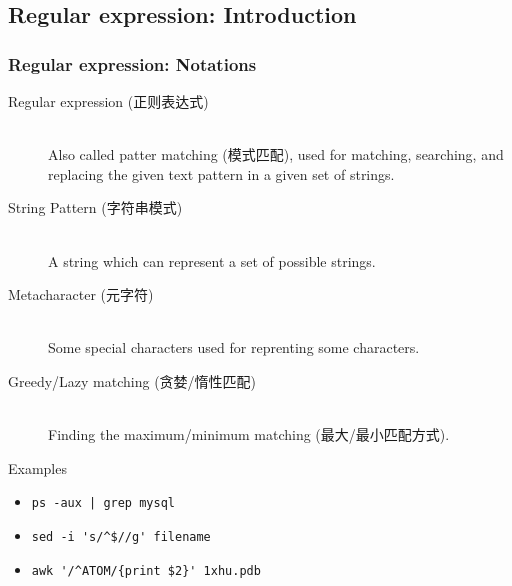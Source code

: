 \documentclass[red]{beamer}
\begin{document}
\begin{CJK*}{UTF8}{gbsn}
\section{Regular expression: Introduction}

\begin{frame}[containsverbatim]
\frametitle{Regular expression: Notations}
\footnotesize
\begin{description}
	\item[Regular expression (正则表达式)]\hfill \\
		Also called patter matching (模式匹配), used for matching, searching, 
		and replacing the given text pattern in a given set of strings.
	\item[String Pattern (字符串模式)] \hfill \\
		A string which can represent a set of possible strings.
	\item[Metacharacter (元字符)] \hfill \\
		Some special characters used for reprenting some characters.
	\item[Greedy/Lazy matching (贪婪/惰性匹配)] \hfill \\
		Finding the maximum/minimum matching (最大/最小匹配方式).
\end{description}
\centering
\begin{block}{Examples}
\begin{itemize}
	\item \lstinline{ps -aux | grep mysql}
	\item \lstinline{sed -i 's/^$//g' filename}
	\item \lstinline|awk '/^ATOM/{print $2}' 1xhu.pdb|
\end{itemize}
\end{block}
\end{frame}


\end{CJK*}
\end{document}

